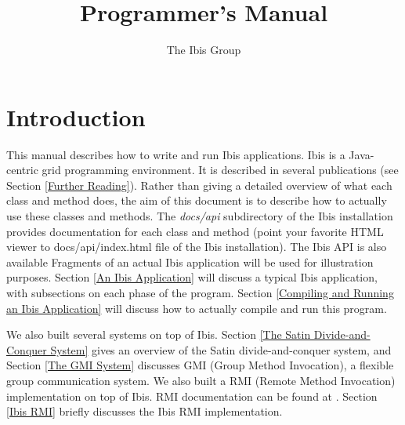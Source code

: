 \documentclass[10pt]{article}
\begin{document}
\title{
{}
{}
Programmer's Manual}

\author{The Ibis Group}

\maketitle

\section{Introduction}

This manual describes how to write and run Ibis applications.
Ibis is a Java-centric grid programming environment.
It is described in several publications (see Section \ref{Further Reading}).
Rather than giving a detailed overview of what each class and method does,
the aim of this document is to describe how to actually use these classes
and methods.
The \emph{docs/api} subdirectory of the Ibis installation provides
documentation for each class and method (point your favorite HTML viewer
to docs/api/index.html file of the Ibis installation).
The Ibis API is also available
Fragments of an actual Ibis application will be used for illustration purposes.
Section \ref{An Ibis Application} will discuss a typical Ibis application,
with subsections on each phase of the program.
Section \ref{Compiling and Running an Ibis Application} will discuss how to
actually compile and run this program.

We also built several systems on top of Ibis.
Section \ref{The Satin Divide-and-Conquer System}
gives an overview of the Satin divide-and-conquer
system, and Section \ref{The GMI System} discusses GMI
(Group Method Invocation),
a flexible group communication system.
We also built a RMI (Remote Method Invocation)
implementation on top of Ibis. RMI documentation can be found at
{}
{}.
Section \ref{Ibis RMI} briefly discusses the Ibis RMI implementation.
\end{document}
